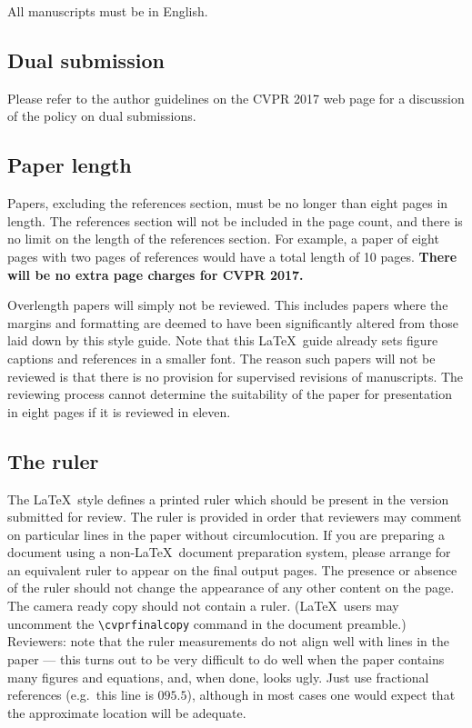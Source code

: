\documentclass[10pt,twocolumn,letterpaper]{article}
\begin{document}
All manuscripts must be in English.

\subsection{Dual submission}

Please refer to the author guidelines on the CVPR 2017 web page for a
discussion of the policy on dual submissions.

\subsection{Paper length}
Papers, excluding the references section,
must be no longer than eight pages in length. The references section
will not be included in the page count, and there is no limit on the
length of the references section. For example, a paper of eight pages
with two pages of references would have a total length of 10 pages.
{\bf There will be no extra page charges for CVPR 2017.}

Overlength papers will simply not be reviewed.  This includes papers
where the margins and formatting are deemed to have been significantly
altered from those laid down by this style guide.  Note that this
\LaTeX\ guide already sets figure captions and references in a smaller font.
The reason such papers will not be reviewed is that there is no provision for
supervised revisions of manuscripts.  The reviewing process cannot determine
the suitability of the paper for presentation in eight pages if it is
reviewed in eleven.  

\subsection{The ruler}
The \LaTeX\ style defines a printed ruler which should be present in the
version submitted for review.  The ruler is provided in order that
reviewers may comment on particular lines in the paper without
circumlocution.  If you are preparing a document using a non-\LaTeX\
document preparation system, please arrange for an equivalent ruler to
appear on the final output pages.  The presence or absence of the ruler
should not change the appearance of any other content on the page.  The
camera ready copy should not contain a ruler. (\LaTeX\ users may uncomment
the \verb'\cvprfinalcopy' command in the document preamble.)  Reviewers:
note that the ruler measurements do not align well with lines in the paper
--- this turns out to be very difficult to do well when the paper contains
many figures and equations, and, when done, looks ugly.  Just use fractional
references (e.g.\ this line is $095.5$), although in most cases one would
expect that the approximate location will be adequate.
\end{document}
